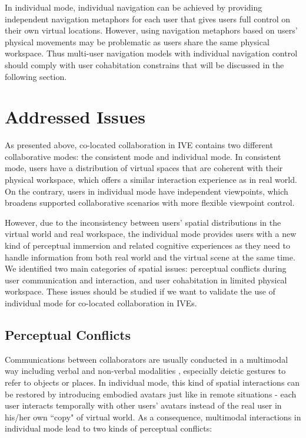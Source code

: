 In individual mode, individual navigation can be achieved by providing independent navigation metaphors for each user that gives users full control on their own virtual locations. However, using navigation metaphors based on users' physical movements may be problematic as users share the same physical workspace. Thus multi-user navigation models with individual navigation control should comply with user cohabitation constrains that will be discussed in the following section.



\section{Addressed Issues}
As presented above, co-located collaboration in IVE contains two different collaborative modes: the consistent mode and individual mode. In consistent mode, users have a distribution of virtual spaces that are coherent with their physical workspace, which offers a similar interaction experience as in real world. On the contrary, users in individual mode have independent viewpoints, which broadens supported collaborative scenarios with more flexible viewpoint control.

However, due to the inconsistency between users' spatial distributions in the virtual world and real workspace, the individual mode provides users with a new kind of perceptual immersion and related cognitive experiences as they need to handle information from both real world and the virtual scene at the same time. We identified two main categories of spatial issues: perceptual conflicts during user communication and interaction, and user cohabitation in limited physical workspace. These issues should be studied if we want to validate the use of individual mode for co-located collaboration in IVEs. 


\subsection{Perceptual Conflicts}
Communications between collaborators are usually conducted in a multimodal way \citep{Paggio2005Multimodal} including verbal and non-verbal modalities \citep{Ennis2010Seeing, Dodds2011Talk}, especially deictic gestures to refer to objects or places. In individual mode, this kind of spatial interactions can be restored by introducing embodied avatars just like in remote situations - each user interacts temporally with other users' avatars instead of the real user in his/her own ``copy" of virtual world.  As a consequence, multimodal interactions in individual mode lead to two kinds of perceptual conflicts:

